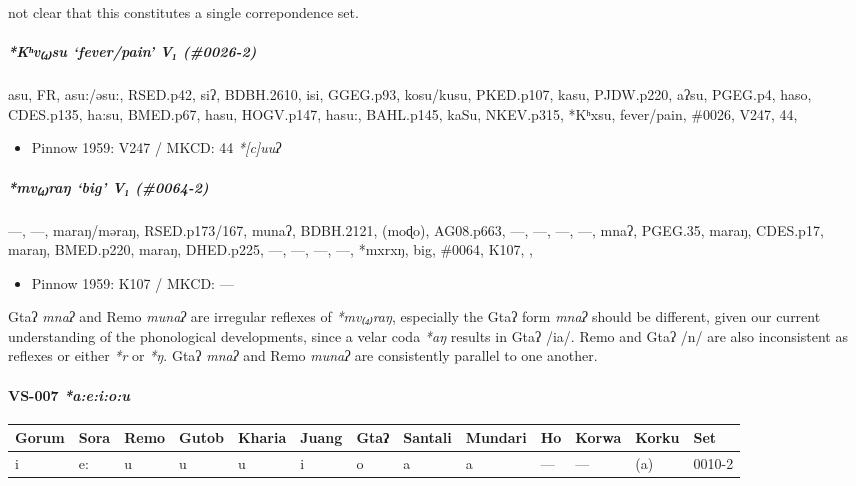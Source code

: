 \documentclass[a4paper,]{article}
\providecommand{\tightlist}{%
  \setlength{\itemsep}{0pt}\setlength{\parskip}{0pt}}
\let\oldparagraph\paragraph
\renewcommand{\paragraph}[1]{\oldparagraph{#1}\mbox{}}
\let\oldsubparagraph\subparagraph
\renewcommand{\subparagraph}[1]{\oldsubparagraph{#1}\mbox{}}
\begin{document}
not clear that this constitutes a single correpondence set.

\subparagraph{\texorpdfstring{\emph{*Kʰv₍₄₎su} `fever/pain' V₁
(\#0026-2)}{*Kʰv₍₄₎su fever/pain V₁ (\#0026-2)}}\label{kux2b0vsu-feverpain-v-0026-2}

asu, FR, asu:/əsu:, RSED.p42, siʔ, BDBH.2610, isi, GGEG.p93, kosu/kusu,
PKED.p107, kasu, PJDW.p220, aʔsu, PGEG.p4, haso, CDES.p135, ha:su,
BMED.p67, hasu, HOGV.p147, hasu:, BAHL.p145, kaSu, NKEV.p315, *Kʰxsu,
fever/pain, \#0026, V247, 44,

\begin{itemize}
\tightlist
\item
  Pinnow 1959: V247 / MKCD: 44 \emph{*{[}c{]}uuʔ}
\end{itemize}

\subparagraph{\texorpdfstring{\emph{*mv₍₄₎raŋ} `big' V₁
(\#0064-2)}{*mv₍₄₎raŋ big V₁ (\#0064-2)}}\label{mvraux14b-big-v-0064-2}

---, ---, maraŋ/məraŋ, RSED.p173/167, munaʔ, BDBH.2121, (moɖo),
AG08.p663, ---, ---, ---, ---, mnaʔ, PGEG.35, maraŋ, CDES.p17, maraŋ,
BMED.p220, maraŋ, DHED.p225, ---, ---, ---, ---, *mxrxŋ, big, \#0064,
K107, ,

\begin{itemize}
\tightlist
\item
  Pinnow 1959: K107 / MKCD: ---
\end{itemize}

Gtaʔ \emph{mnaʔ} and Remo \emph{munaʔ} are irregular reflexes of
\emph{*mv₍₄₎raŋ}, especially the Gtaʔ form \emph{mnaʔ} should be
different, given our current understanding of the phonological
developments, since a velar coda \emph{*aŋ} results in Gtaʔ /ia/. Remo
and Gtaʔ /n/ are also inconsistent as reflexes or either \emph{*r} or
\emph{*ŋ}. Gtaʔ \emph{mnaʔ} and Remo \emph{munaʔ} are consistently
parallel to one another.

\paragraph{\texorpdfstring{VS-007
\emph{*a:e:i:o:u}}{VS-007 *a:e:i:o:u}}\label{vs-007-aeiou}

\begin{longtable}[]{@{}lllllllllllll@{}}
\toprule
Gorum & Sora & Remo & Gutob & Kharia & Juang & Gtaʔ & Santali & Mundari
& Ho & Korwa & Korku & Set\tabularnewline
\midrule
\endhead
i & e: & u & u & u & i & o & a & a & --- & --- & (a) &
0010-2\tabularnewline
\bottomrule
\end{longtable}
\end{document}
